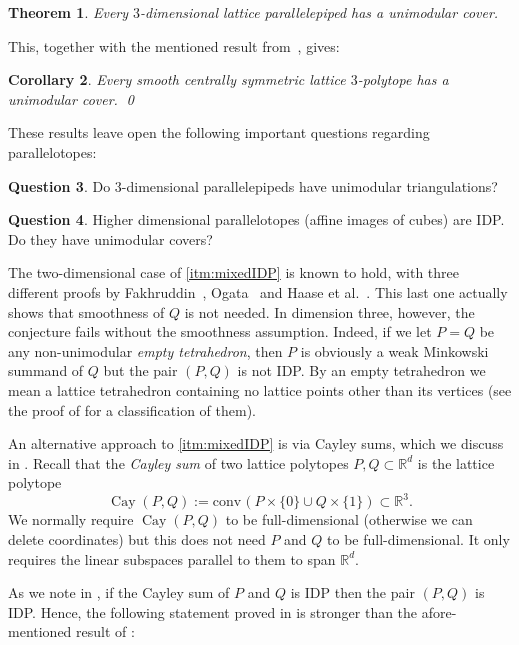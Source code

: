 \documentclass{amsart}
\theoremstyle{plain}
\newtheorem{theorem}{Theorem}[section]
\newtheorem{corollary}[theorem]{Corollary}
\theoremstyle{definition}
\newtheorem{question}[theorem]{Question}
\newcommand{\R}{ \ensuremath{\mathbb{R}}}
\newcommand{\conv}{\ensuremath{\mathrm{conv}}\hspace{1pt}}
\newcommand{\cayley}{\operatorname{Cay}}
\begin{document}
\begin{theorem}
\label{thm:parallelepipeds}
Every $3$-dimensional lattice parallelepiped has a unimodular cover.
\end{theorem}

This, together with the mentioned result from~\cite{BHHHJKM2019}, gives:

\begin{corollary}
\label{coro:3cs}
Every smooth centrally symmetric lattice $3$-polytope has a unimodular cover. 
\qed
\end{corollary}

These results leave open the following important questions regarding parallelotopes:

\begin{question}
Do $3$-dimensional parallelepipeds have unimodular triangulations?
\end{question}

\begin{question}
Higher dimensional parallelotopes (affine images of cubes) are IDP. Do they have unimodular covers? 
\end{question}


The two-dimensional case of \eqref{itm:mixedIDP} is known to hold, with three different proofs by Fakhruddin~\cite{Fakhruddin}, Ogata~\cite{Ogata} and Haase et al.~\cite{HNPS2008}. This last one actually shows that smoothness of $Q$ is not needed. In dimension three, however, the conjecture fails without the smoothness assumption. Indeed, if we let $P=Q$ be any non-unimodular \emph{empty tetrahedron}, then $P$ is obviously a weak Minkowski summand of $Q$ but the pair $(P, Q)$ is not IDP. By an empty tetrahedron we mean a lattice tetrahedron containing no lattice points other than its vertices (see the proof of  for a classification of them).

An alternative approach to \eqref{itm:mixedIDP} is via Cayley sums, which we discuss in  . 
Recall that the \emph{Cayley sum} of two lattice polytopes $P,Q\subset \R^d$ is the lattice polytope
\[
\cayley(P,Q) := \conv(P\times\{0\} \cup Q \times \{1\}) \subset \R^3.
\]
We normally require $\cayley(P,Q)$ to be full-dimensional (otherwise we can delete coordinates) but this does not need $P$ and $Q$ to be full-dimensional. It only requires the linear subspaces parallel to them to span $\R^d$.

As we note in , if the Cayley sum of $P$ and $Q$ is IDP then the pair $(P,Q)$ is IDP.
Hence, the following statement proved in  is stronger than the afore-mentioned result of \cite{Fakhruddin,HNPS2008,Ogata}:
\end{document}
